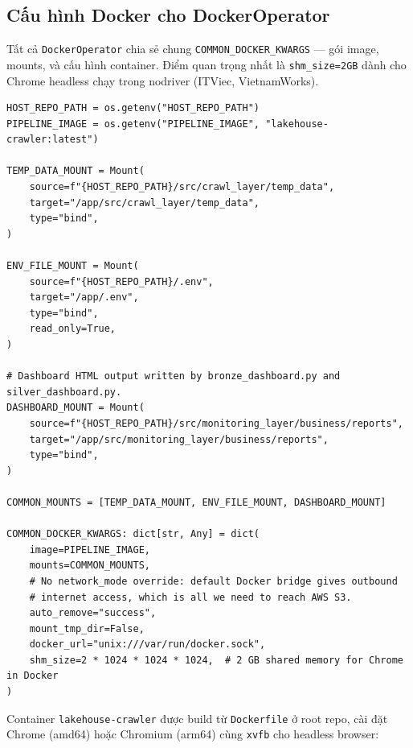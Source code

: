 \subsection{Cấu hình Docker cho DockerOperator}
\label{subsec:docker-config}

Tất cả \texttt{DockerOperator} chia sẻ chung \texttt{COMMON\_DOCKER\_KWARGS} ---
gói image, mounts, và cấu hình container. Điểm quan trọng nhất là
\texttt{shm\_size=2GB} dành cho Chrome headless chạy trong nodriver (ITViec,
VietnamWorks).

\begin{lstlisting}[style=pystyle, caption={COMMON\_DOCKER\_KWARGS — cấu hình dùng chung cho mọi DockerOperator}]
HOST_REPO_PATH = os.getenv("HOST_REPO_PATH")
PIPELINE_IMAGE = os.getenv("PIPELINE_IMAGE", "lakehouse-crawler:latest")

TEMP_DATA_MOUNT = Mount(
    source=f"{HOST_REPO_PATH}/src/crawl_layer/temp_data",
    target="/app/src/crawl_layer/temp_data",
    type="bind",
)

ENV_FILE_MOUNT = Mount(
    source=f"{HOST_REPO_PATH}/.env",
    target="/app/.env",
    type="bind",
    read_only=True,
)

# Dashboard HTML output written by bronze_dashboard.py and silver_dashboard.py.
DASHBOARD_MOUNT = Mount(
    source=f"{HOST_REPO_PATH}/src/monitoring_layer/business/reports",
    target="/app/src/monitoring_layer/business/reports",
    type="bind",
)

COMMON_MOUNTS = [TEMP_DATA_MOUNT, ENV_FILE_MOUNT, DASHBOARD_MOUNT]

COMMON_DOCKER_KWARGS: dict[str, Any] = dict(
    image=PIPELINE_IMAGE,
    mounts=COMMON_MOUNTS,
    # No network_mode override: default Docker bridge gives outbound
    # internet access, which is all we need to reach AWS S3.
    auto_remove="success",
    mount_tmp_dir=False,
    docker_url="unix:///var/run/docker.sock",
    shm_size=2 * 1024 * 1024 * 1024,  # 2 GB shared memory for Chrome in Docker
)
\end{lstlisting}

Container \texttt{lakehouse-crawler} được build từ
\texttt{Dockerfile} ở root repo, cài đặt Chrome (amd64) hoặc
Chromium (arm64) cùng \texttt{xvfb} cho headless browser:

